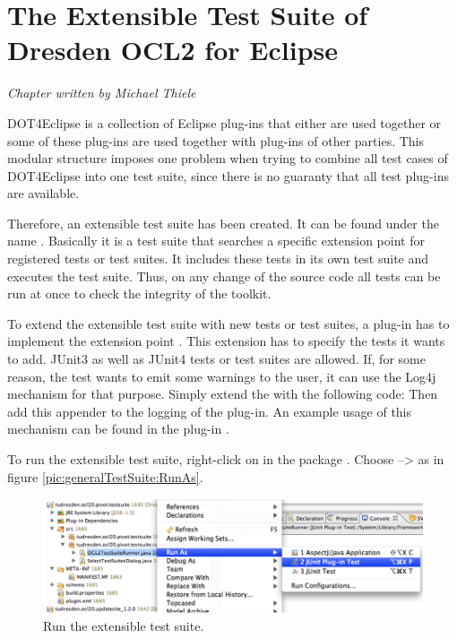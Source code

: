 \chapter{The Extensible Test Suite of Dresden OCL2 for Eclipse}
\label{chapter:generalTestSuite}

\begin{flushright}
\textit{Chapter written by Michael Thiele}
\end{flushright}

\acl{DOT4Eclipse} is a collection of Eclipse plug-ins that either are used together or some of these plug-ins are used together with plug-ins of other parties. This modular structure imposes one problem when trying to combine all test cases of \acl{DOT4Eclipse} into one test suite, since there is no guaranty that all test plug-ins are available.

Therefore, an extensible test suite has been created. It can be found under the name . Basically it is a test suite that searches a specific extension point for registered tests or test suites. It includes these tests in its own test suite and executes the test suite. Thus, on any change of the source code all tests can be run at once to check the integrity of the toolkit.

To extend the extensible test suite with new tests or test suites, a plug-in has to implement the extension point . This extension has to specify the tests it wants to add. JUnit3 as well as JUnit4 tests or test suites are allowed. If, for some reason, the test wants to emit some warnings to the user, it can use the Log4j mechanism for that purpose. Simply extend the  with the following code:
Then add this appender to the logging of the plug-in. An example usage of this mechanism can be found in the plug-in .

To run the extensible test suite, right-click on  in the package . Choose  --\textgreater {} as in figure \ref{pic:generalTestSuite:RunAs}.

\begin{figure}[!htbp]
	\centering
	\includegraphics[width=1.0\linewidth]{figures/generalTestSuite/RunAs}
	\caption{Run the extensible test suite.}
	\label{pic: generalTestSuite:RunAs}
\end{figure}